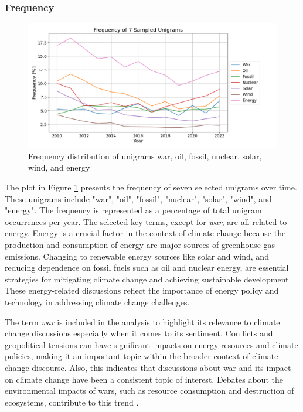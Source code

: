 \subsubsection{Frequency}
\begin{figure}[h]
    \includegraphics[width=\textwidth]{images/topic_details/ngram/frequency_per_topic_7Unigram.png}
    \caption{Frequency distribution of unigrams war, oil, fossil, nuclear, solar, wind, and energy}
    \label{fig:frequency_unigrams}
\end{figure}
The plot in Figure \ref{fig:frequency_unigrams} presents the frequency of seven selected unigrams over time. These unigrams include "war", "oil", "fossil", "nuclear", "solar", "wind", and "energy". The frequency is represented as a percentage of total unigram occurrences per year. The selected key terms, except for \emph{war}, are all related to energy. Energy is a crucial factor in the context of climate change because the production and consumption of energy are major sources of greenhouse gas emissions. Changing to renewable energy sources like solar and wind, and reducing dependence on fossil fuels such as oil and nuclear energy, are essential strategies for mitigating climate change and achieving sustainable development. These energy-related discussions reflect the importance of energy policy and technology in addressing climate change challenges.

The term \emph{war} is included in the analysis to highlight its relevance to climate change discussions especially when it comes to its sentiment. Conflicts and geopolitical tensions can have significant impacts on energy resources and climate policies, making it an important topic within the broader context of climate change discourse. Also, this indicates that discussions about war and its impact on climate change have been a consistent topic of interest. Debates about the environmental impacts of wars, such as resource consumption and destruction of ecosystems, contribute to this trend \cite{hsiang2014climate}.

